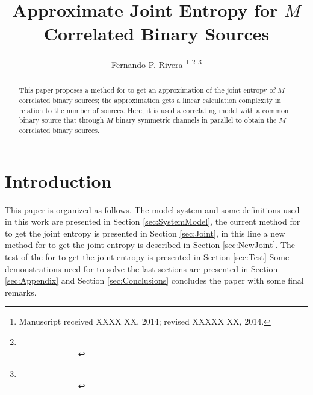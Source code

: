 \documentclass[journal]{IEEEtran}
\begin{document}
\title{Approximate Joint Entropy for $M$ Correlated Binary Sources }


\author{Fernando P. Rivera 
\thanks{Manuscript received XXXX XX, 2014; revised XXXXX XX, 2014.}
\thanks{---------- ---------- ---------- ---------- ---------- ---------- ---------- ---------- ---------- ---------- ---------- }%
\thanks{---------- ---------- ---------- ---------- ---------- ---------- ---------- ---------- ---------- ---------- ---------- }}%


\maketitle


\begin{abstract}
This paper proposes a method for to get an approximation of the joint entropy
of $M$ correlated binary sources; the approximation gets a linear calculation complexity 
in relation to the number of sources. 
Here, it is used a correlating model with a common
binary source that through $M$ binary symmetric channels in parallel
to obtain  the $M$ correlated binary sources. 

\end{abstract}


\IEEEpeerreviewmaketitle
\section{Introduction}
\label{sec:Intro}
 
 
This paper is organized as follows. The model system and some definitions 
used in this work are presented in Section \ref{sec:SystemModel}, the current method for to get the joint entropy is presented in Section \ref{sec:Joint}, in this line a new method for to get
the joint entropy is described in Section \ref{sec:NewJoint}. 
The test of the for to get the joint entropy is presented in Section \ref{sec:Test}
Some demonstrations
need for to solve the last sections are presented in
Section \ref{sec:Appendix} and Section \ref{sec:Conclusions} concludes the paper 
with some final remarks.
\end{document}
